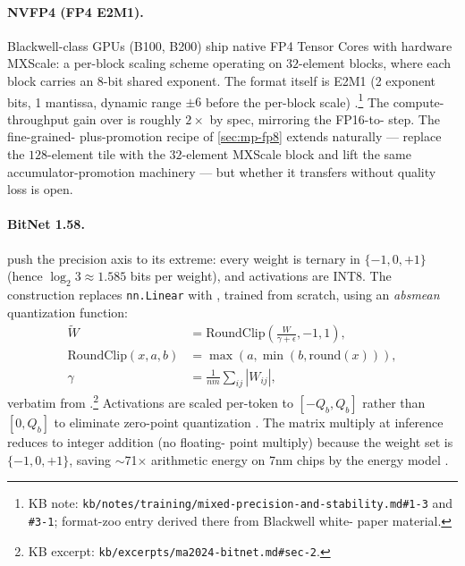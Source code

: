 \paragraph{NVFP4 (FP4 E2M1).} Blackwell-class GPUs (B100, B200) ship
native FP4 Tensor Cores with hardware MXScale: a per-block scaling
scheme operating on $32$-element blocks, where each block carries an
8-bit shared exponent. The format itself is E2M1 (2 exponent bits, 1
mantissa, dynamic range $\pm 6$ before the per-block scale)
\citep[\S 3.3, format zoo]{deepseek-v3}.\footnote{KB note:
\nolinkurl{kb/notes/training/mixed-precision-and-stability.md#1-3} and
\texttt{\#3-1}; format-zoo entry derived there from Blackwell white-
paper material.} The compute-throughput gain over  is roughly
$2\times$ by spec, mirroring the FP16-to- step. The fine-grained-
plus-promotion recipe of \cref{sec:mp-fp8} extends naturally — replace
the $128$-element tile with the $32$-element MXScale block and lift
the same accumulator-promotion machinery — but whether it transfers
without quality loss is open.

\paragraph{BitNet 1.58.} \citet{ma2024-bitnet} push the precision
axis to its extreme: every weight is ternary in $\{-1, 0, +1\}$
(hence $\log_2 3 \approx 1.585$ bits per weight), and activations are
INT8. The construction replaces \texttt{nn.Linear} with
\texttt{}, trained from scratch, using an \emph{absmean}
quantization function:
\begin{align}
\widetilde{W} &= \mathrm{RoundClip}\!\left(\tfrac{W}{\gamma + \epsilon}, -1, 1\right),
   \label{eq:bitnet-quant} \\
\mathrm{RoundClip}(x, a, b) &= \max(a, \min(b, \mathrm{round}(x))),
   \label{eq:roundclip} \\
\gamma &= \tfrac{1}{nm} \sum_{ij} |W_{ij}|,
   \label{eq:bitnet-gamma}
\end{align}
verbatim from \citet[\S 2, eqs.\ 1--3]{ma2024-bitnet}.\footnote{KB
excerpt: \nolinkurl{kb/excerpts/ma2024-bitnet.md#sec-2}.} Activations
are scaled per-token to $[-Q_b, Q_b]$ rather than $[0, Q_b]$ to
eliminate zero-point quantization \citep[\S 2]{ma2024-bitnet}. The
matrix multiply at inference reduces to integer addition (no floating-
point multiply) because the weight set is $\{-1, 0, +1\}$, saving
$\sim$71$\times$ arithmetic energy on 7nm chips by the
\citet{ma2024-bitnet} energy model \citep[\S 3]{ma2024-bitnet}.

